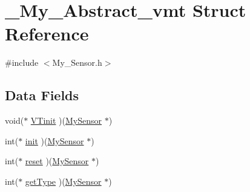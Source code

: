\hypertarget{struct___my___abstract__vmt}{\section{\-\_\-\-My\-\_\-\-Abstract\-\_\-vmt Struct Reference}
\label{struct___my___abstract__vmt}
}


{\ttfamily \#include $<$My\-\_\-\-Sensor.\-h$>$}

\subsection*{Data Fields}
\begin{DoxyCompactItemize}
\item 
void($\ast$ \hyperlink{struct___my___abstract__vmt_a2c999bc46b0745aa624051ac48d3347e}{V\-Tinit} )(\hyperlink{_my___sensor_8h_aec3fece1ce83f3dd577aa3228199813f}{My\-Sensor} $\ast$)
\item 
int($\ast$ \hyperlink{struct___my___abstract__vmt_a8f309bfdf6a70191aaa8c53a1ce55d83}{init} )(\hyperlink{_my___sensor_8h_aec3fece1ce83f3dd577aa3228199813f}{My\-Sensor} $\ast$)
\item 
int($\ast$ \hyperlink{struct___my___abstract__vmt_a825ffb364bcce5bb1ebfec3a61fd399c}{reset} )(\hyperlink{_my___sensor_8h_aec3fece1ce83f3dd577aa3228199813f}{My\-Sensor} $\ast$)
\item 
int($\ast$ \hyperlink{struct___my___abstract__vmt_afa39974172b5cb02e5bb29c28628fde7}{get\-Type} )(\hyperlink{_my___sensor_8h_aec3fece1ce83f3dd577aa3228199813f}{My\-Sensor} $\ast$)
\end{DoxyCompactItemize}


